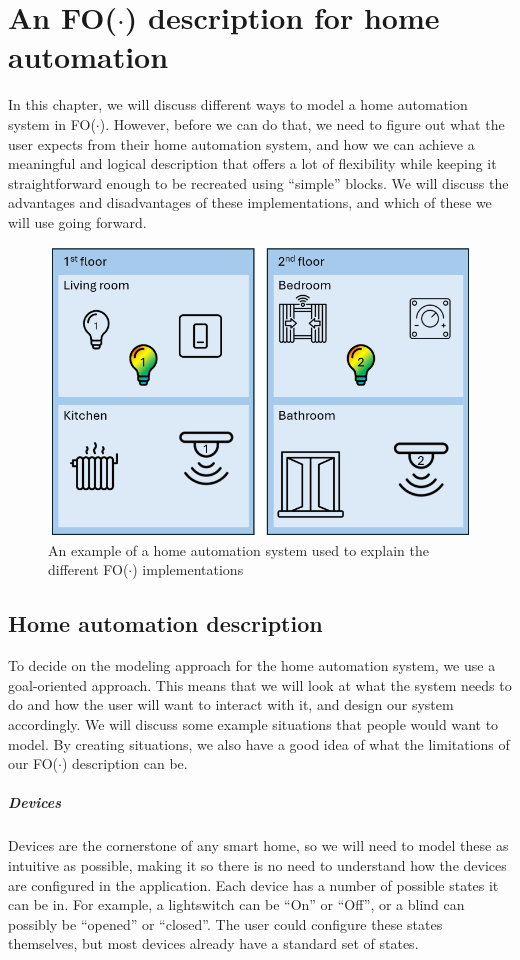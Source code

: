 \documentclass[11pt,a4paper]{report}
\newcommand{\fodot}{FO($\cdot$)\xspace}
\begin{document}
\chapter{An \fodot description for home automation}
\label{home_automation_and_fodot}
In this chapter, we will discuss different ways to model a home automation system in \fodot. However, before we can do that, we need to figure out what the user expects from their home automation system, and how we can achieve a meaningful and logical description that offers a lot of flexibility while keeping it straightforward enough to be recreated using ``simple'' blocks. We will discuss the advantages and disadvantages of these implementations, and which of these we will use going forward.

\begin{figure}
    \centering
    \includegraphics[width=0.8\linewidth]{images/fodot-structure_example.png}
    \caption{An example of a home automation system used to explain the different \fodot implementations}
    \label{fig:fodot-structure_example}
\end{figure}

\section{Home automation description}
To decide on the modeling approach for the home automation system, we use a goal-oriented approach. This means that we will look at what the system needs to do and how the user will want to interact with it, and design our system accordingly. We will discuss some example situations that people would want to model. By creating situations, we also have a good idea of what the limitations of our \fodot description can be.

\paragraph{Devices}
Devices are the cornerstone of any smart home, so we will need to model these as intuitive as possible, making it so there is no need to understand how the devices are configured in the application. Each device has a number of possible states it can be in. For example, a lightswitch can be ``On'' or ``Off'', or a blind can possibly be ``opened'' or ``closed''. The user could configure these states themselves, but most devices already have a standard set of states. 
\end{document}
